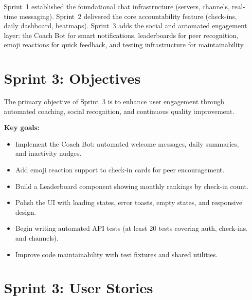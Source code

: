 \documentclass[11pt]{article}
\begin{document}
Sprint~1 established the foundational chat infrastructure (servers, channels, real-time messaging). Sprint~2 delivered the core accountability feature (check-ins, daily dashboard, heatmaps). Sprint~3 adds the social and automated engagement layer: the Coach Bot for smart notifications, leaderboards for peer recognition, emoji reactions for quick feedback, and testing infrastructure for maintainability.

\section{Sprint 3: Objectives}

The primary objective of Sprint~3 is to enhance user engagement through automated coaching, social recognition, and continuous quality improvement.

\textbf{Key goals:}
\begin{itemize}[leftmargin=1.5em]
    \item Implement the Coach Bot: automated welcome messages, daily summaries, and inactivity nudges.
    \item Add emoji reaction support to check-in cards for peer encouragement.
    \item Build a Leaderboard component showing monthly rankings by check-in count.
    \item Polish the UI with loading states, error toasts, empty states, and responsive design.
    \item Begin writing automated API tests (at least 20 tests covering auth, check-ins, and channels).
    \item Improve code maintainability with test fixtures and shared utilities.
\end{itemize}

\section{Sprint 3: User Stories}
\end{document}
